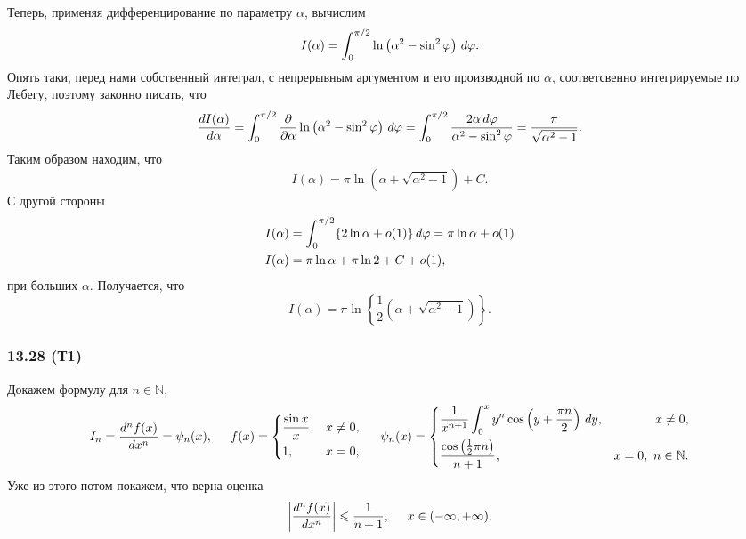 Теперь, применяя дифференцирование по параметру $\alpha$, вычислим
\begin{equation*}
    I(\alpha) = \int_0^{\pi/2}  \ln \left(
        \alpha^2 - \sin^2 \varphi
    \right) \d \varphi.
\end{equation*}
Опять таки, перед нами собственный интеграл, с непрерывным аргументом и его производной по $\alpha$, соответсвенно интегрируемые по Лебегу, поэтому законно писать, что
\begin{equation*}
    \frac{d I(\alpha)}{d \alpha} = \int_0^{\pi/2}  \frac{\partial }{\partial \alpha} \ln \left(\alpha^2 - \sin^2 \varphi\right) \d \varphi = 
    \int_0^{\pi/2} \frac{2\alpha \d \varphi}{\alpha^2 - \sin^2 \varphi} = \frac{\pi}{\sqrt{\alpha^2-1}}.
\end{equation*}
Таким образом находим, что
\begin{equation*}
    I(\alpha) = \pi \ln ( \alpha + \sqrt{\alpha^2-1}) + C.
\end{equation*}
С другой стороны
\begin{align*}
    I(\alpha) &= \int_0^{\pi/2} \{2 \ln \alpha + o(1)\} \d \varphi = \pi \ln \alpha + o(1) \\
    I(\alpha) &= \pi \ln \alpha + \pi \ln 2 + C + o(1),
\end{align*}
при больших $\alpha$. Получается, что
\begin{equation*}
    I(\alpha) = \pi \ln \left\{
        \frac{1}{2}\left(
            \alpha + \sqrt{\alpha^2-1}
        \right)
    \right\}.
\end{equation*}




\subsubsection*{13.28 (Т1)}

Докажем формулу для $n \in \mathbb{N}$,
\begin{equation*}
    I_n = \frac{d^n f(x)}{d x^n} = \psi_n (x),
    \hspace{5 mm}
    f(x) = \left\{\begin{aligned}
        &\frac{\sin x}{x}, &x \neq 0, \\
        &1, &x = 0,
    \end{aligned}\right.
    \hspace{5 mm}
    \psi_n (x) = \left\{\begin{aligned}
        &\frac{1}{x^{n+1}} \int_0^x y^n \cos \left(
            y + \frac{\pi n}{2}
        \right) \d y, &x\neq 0, \\
        &\frac{\cos \left(\frac{1}{2} \pi n\right)}{n+1}, &x = 0, \ n \in \mathbb{N}.
    \end{aligned}\right.
\end{equation*}
Уже из этого потом покажем, что верна оценка
\begin{equation*}
    \bigg|
        \frac{d^n f(x)}{d x^n} 
    \bigg| \leq \frac{1}{n+1}, \hspace{5 mm} x \in (-\infty, + \infty).
\end{equation*}

